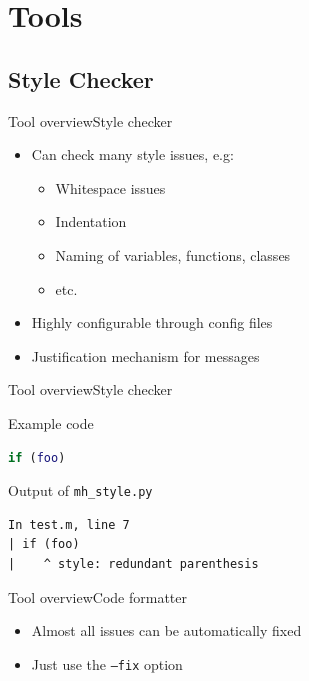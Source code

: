\documentclass{beamer}
\begin{document}
\section{Tools}
\subsection{Style Checker}
\begin{frame}{Tool overview}{Style checker}
  \begin{itemize}
  \item Can check many style issues, e.g:
    \begin{itemize}
    \item Whitespace issues
    \item Indentation
    \item Naming of variables, functions, classes
    \item etc.
    \end{itemize}
  \item Highly configurable through config files
  \item Justification mechanism for messages
  \end{itemize}
\end{frame}

\begin{frame}[fragile]{Tool overview}{Style checker}
  \begin{block}{Example code}
\begin{lstlisting}[language=MATLAB]
if (foo)
\end{lstlisting}
  \end{block}
  \pause
  \begin{block}{Output of {\tt mh\_style.py}}
    \scriptsize
\begin{verbatim}
In test.m, line 7
| if (foo)
|    ^ style: redundant parenthesis
\end{verbatim}
  \end{block}
\end{frame}

\begin{frame}{Tool overview}{Code formatter}
  \begin{itemize}
  \item Almost all issues can be automatically fixed
  \item Just use the {\tt --fix} option
  \end{itemize}
\end{frame}
\end{document}
